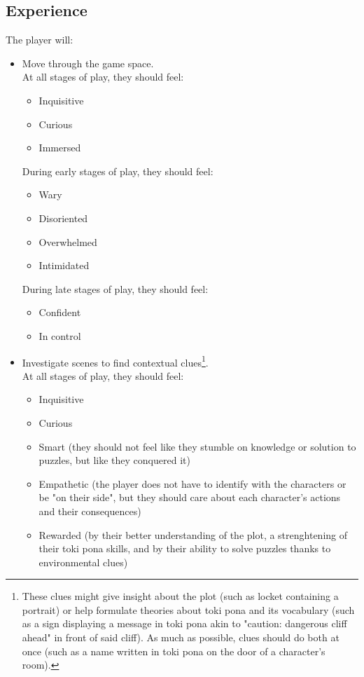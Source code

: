 \documentclass{scrartcl}
\begin{document}
		\subsection{Experience}
		The player will:
		\begin{itemize}
			\item Move through the game space. \\
			At all stages of play, they should feel:
			\begin{itemize}
				\item Inquisitive
				\item Curious
				\item Immersed
			\end{itemize}
			During early stages of play, they should feel: 
			\begin{itemize}
				\item Wary
				\item Disoriented
				\item Overwhelmed
				\item Intimidated
			\end{itemize}
			During late stages of play, they should feel:
			\begin{itemize}
				\item Confident
				\item In control
			\end{itemize}
			\item Investigate scenes to find contextual clues\footnote{These clues might give insight about the plot (such as locket containing a portrait) or help formulate theories about toki pona and its vocabulary (such as a sign displaying a message in toki pona akin to "caution: dangerous cliff ahead" in front of said cliff). As much as possible, clues should do both at once (such as a name written in toki pona on the door of a character's room).}.\\
			At all stages of play, they should feel:
			\begin{itemize}
				\item Inquisitive
				\item Curious
				\item Smart (they should not feel like they stumble on knowledge or solution to puzzles, but like they conquered it)
				\item Empathetic (the player does not have to identify with the characters or be "on their side", but they should care about each character's actions and their consequences)
				\item Rewarded (by their better understanding of the plot, a strenghtening of their toki pona skills, and by their ability to solve puzzles thanks to environmental clues)

\end{itemize}
\end{itemize}
\end{document}
